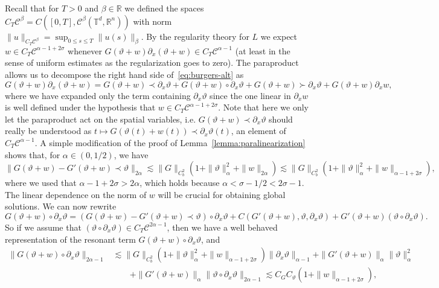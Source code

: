 \documentclass[11pt,a4paper]{article}
\theoremstyle{remark}
\newcommand{\CC}{\ensuremath{\mathscr{C}}}
\begin{document}
Recall that for $T>0$
and $\beta \in \mathbb{R}$ we defined the spaces $C_{T} \CC^{\beta} =C( [ 0,T ], \CC^{\beta} ( \mathbb{T}^{d},\mathbb{R}^{n} ))$
with norm $\| u \|_{C_{T} \CC^{\beta}} = \sup_{0 \leqslant s \leqslant T} \| u ( s ) \|_{\beta}$. By the regularity theory for $L$ we expect $w \in C_{T} \CC^{\alpha -1+2 \sigma}$ whenever $G ( \vartheta +w ) \partial_{x} ( \vartheta +w ) \in C_{T}\CC^{\alpha -1}$ (at least in the sense of uniform estimates as the
regularization goes to zero). The paraproduct allows us to decompose the right
hand side of~{\eqref{eq:burgers-alt}} as
\[
   G ( \vartheta +w ) \partial_{x} ( \vartheta +w ) =G ( \vartheta +w ) \prec \partial_{x} \vartheta +G ( \vartheta +w ) \circ \partial_{x} \vartheta +G( \vartheta +w ) \succ \partial_{x} \vartheta +G ( \vartheta +w ) \partial_{x} w,
\]
where we have expanded only the term containing $\partial_{x} \vartheta$ since
the one linear in $\partial_{x} w$ is well defined under the hypothesis that
$w \in C_{T} \CC^{\alpha -1+2 \sigma}$. Note that here we only let the
paraproduct act on the spatial variables, i.e. $G ( \vartheta +w ) \prec \partial_{x} \vartheta$ should really be understood as $t \mapsto G (\vartheta ( t ) +w ( t ) ) \prec \partial_{x} \vartheta ( t )$, an element of
$C_{T} \CC^{\alpha -1}$. A simple modification of the proof of
Lemma~\ref{lemma:paralinearization} shows that, for $\alpha \in (0,1/2)$, we have
\[
   \| G ( \vartheta +w ) -G' ( \vartheta +w ) \prec \vartheta \|_{2 \alpha}  \lesssim \| G \|_{C^{2}_{b}} ( 1+ \| \vartheta \|^{2}_{\alpha} + \| w \|_{2 \alpha} ) \lesssim \| G \|_{C^{2}_{b}} ( 1+ \| \vartheta \|^{2}_{\alpha} +  \| w \|_{\alpha -1+2 \sigma} ) ,
\]
where we used that $\alpha -1+2 \sigma >2 \alpha$, which holds because $\alpha < \sigma -1/2<2 \sigma -1$. The linear dependence on the norm of $w$ will be
crucial for obtaining global solutions. We can now rewrite
\[
   G ( \vartheta +w ) \circ \partial_{x} \vartheta = ( G ( \vartheta +w ) -G'( \vartheta +w ) \prec \vartheta ) \circ \partial_{x} \vartheta +C ( G' ( \vartheta +w ) , \vartheta , \partial_{x} \vartheta ) +G' ( \vartheta +w )( \vartheta \circ \partial_{x} \vartheta ).
\]
So if we assume that $( \vartheta \circ \partial_{x} \vartheta ) \in C_{T} \CC^{2 \alpha -1}$, then we have a well behaved representation of the resonant
term $G ( \vartheta +w ) \circ \partial_{x} \vartheta$, and
\begin{align}\label{eq:burgers resonant estimate} \nonumber
   \| G ( \vartheta +w ) \circ \partial_{x} \vartheta \|_{2 \alpha -1} & \lesssim \| G \|_{C^{2}_{b}} ( 1+ \| \vartheta \|^{2}_{\alpha} + \| w \|_{\alpha -1+2 \sigma} ) \| \partial_{x} \vartheta \|_{\alpha -1} + \| G'( \vartheta +w ) \|_{\alpha} \| \vartheta \|_{\alpha}^{2} \\
   &\qquad + \| G' ( \vartheta +w ) \|_{\alpha} \| \vartheta \circ \partial_{x} \vartheta \|_{2 \alpha -1} \lesssim C_{G} C_{\vartheta} ( 1+ \| w \|_{\alpha -1+2 \sigma} ) ,
\end{align}
\end{document}
